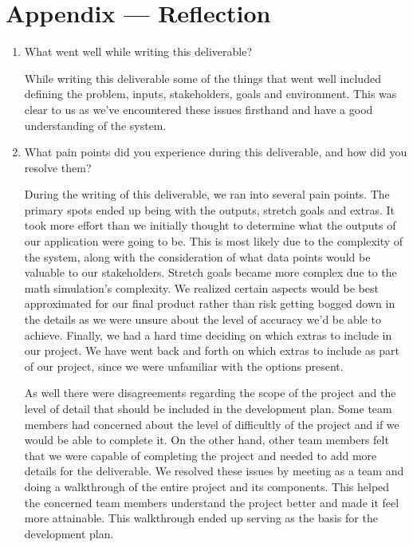 \documentclass{article}
\begin{document}
\newpage{}

\section*{Appendix --- Reflection}



\begin{enumerate}
    \item What went well while writing this deliverable? 

    While writing this deliverable some of the things that went well included
    defining the problem, inputs, stakeholders, goals and environment. This was clear to us as 
    we've encountered these issues firsthand and have a good understanding of the system.
    
    \item What pain points did you experience during this deliverable, and how
    did you resolve them?

    During the writing of this deliverable, we ran into several pain points. The primary spots 
    ended up being with the outputs, stretch goals and extras. It took more effort than we initially
    thought to determine what the outputs of our application were going to be. This is most likely
    due to the complexity of the system, along with the consideration of what data points would be valuable
    to our stakeholders. Stretch goals became more complex due to the math simulation's complexity. We realized
    certain aspects would be best approximated for our final product rather than risk getting bogged down in 
    the details as we were unsure about the level of accuracy we'd be able to achieve. Finally, we had a hard 
    time deciding on which extras to include in our project. We have went back and forth on which extras 
    to include as part of our project, since we were unfamiliar with the options present.

    As well there were disagreements regarding the scope of the project and the level of detail that should be included in the development plan. 
    Some team members had concerned about the level of difficultly of the project and if we would be able to complete it. On the other hand,
    other team members felt that we were capable of completing the project and needed to add more details for the deliverable.
    We resolved these issues by meeting as a team and doing a walkthrough of the entire project and its components.
    This helped the concerned team members understand the project better and made it feel more attainable. 
    This walkthrough ended up serving as the basis for the development plan.


\end{enumerate}
\end{document}
